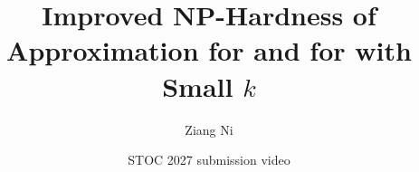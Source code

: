 
\title{Improved NP-Hardness of Approximation for  and for  with Small $k$}
\author{Ziang Ni}
\date{STOC 2027 submission video}







